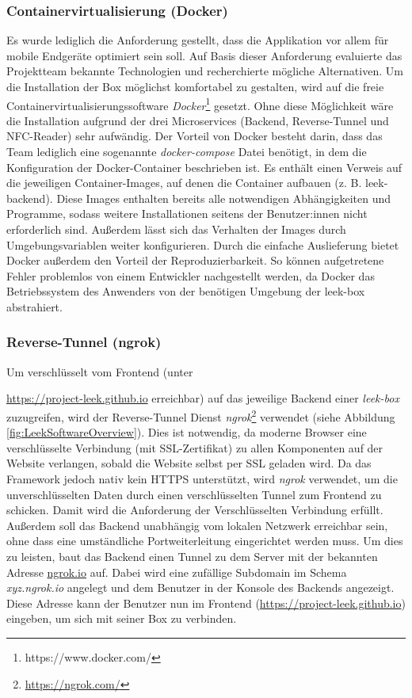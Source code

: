 \documentclass[10pt, a4paper]{article}
\begin{document}
\begin{onehalfspace}
  \subsubsection{Containervirtualisierung (Docker)}
  Es wurde lediglich die Anforderung gestellt, dass die Applikation vor allem für mobile Endgeräte optimiert sein soll.
  Auf Basis dieser Anforderung evaluierte das Projektteam bekannte Technologien und recherchierte mögliche Alternativen.
  Um die Installation der Box möglichst komfortabel zu gestalten, wird auf die freie Containervirtualisierungssoftware \textit{Docker}\footnote{https://www.docker.com/} gesetzt.
  Ohne diese Möglichkeit wäre die Installation aufgrund der drei Microservices (Backend, Reverse-Tunnel und NFC-Reader) sehr aufwändig.
  Der Vorteil von Docker besteht darin, dass das Team lediglich eine sogenannte \textit{docker-compose} Datei benötigt, in dem die Konfiguration der Docker-Container beschrieben ist.
  Es enthält einen Verweis auf die jeweiligen Container-Images, auf denen die Container aufbauen (z. B. leek-backend). Diese Images enthalten bereits alle notwendigen Abhängigkeiten und Programme,
  sodass weitere Installationen seitens der Benutzer:innen nicht erforderlich sind.
  Außerdem lässt sich das Verhalten der Images durch Umgebungsvariablen weiter konfigurieren. Durch die einfache Auslieferung bietet Docker außerdem den Vorteil der Reproduzierbarkeit.
  So können aufgetretene Fehler problemlos von einem Entwickler nachgestellt werden, da Docker das Betriebssystem des Anwenders von der benötigen Umgebung der leek-box abstrahiert.


  \subsubsection{Reverse-Tunnel (ngrok)}
  \label{kapitel:ngrok}
  Um verschlüsselt vom Frontend (unter \raggedright\url{https://project-leek.github.io} erreichbar) auf das jeweilige Backend einer \textit{leek-box} zuzugreifen, wird der Reverse-Tunnel Dienst \textit{ngrok}\footnote{\raggedright\url{https://ngrok.com/}} verwendet (siehe Abbildung \ref{fig:LeekSoftwareOverview}).
  Dies ist notwendig, da moderne Browser eine verschlüsselte Verbindung (mit SSL-Zertifikat) zu allen Komponenten auf der Website verlangen, sobald die Website selbst per SSL geladen wird.
  Da das Framework jedoch nativ kein HTTPS unterstützt, wird \textit{ngrok} verwendet, um die unverschlüsselten Daten durch einen verschlüsselten Tunnel zum Frontend zu schicken. Damit wird die Anforderung der Verschlüsselten Verbindung erfüllt.
  Außerdem soll das Backend unabhängig vom lokalen Netzwerk erreichbar sein, ohne dass eine umständliche Portweiterleitung eingerichtet werden muss. Um dies zu leisten, baut das Backend einen Tunnel zu dem Server mit der bekannten Adresse \url{ngrok.io} auf.
  Dabei wird eine zufällige Subdomain im Schema \textit{xyz.ngrok.io} angelegt und dem Benutzer in der Konsole des Backends angezeigt. Diese Adresse kann der Benutzer nun im Frontend (\url{https://project-leek.github.io}) eingeben, um sich mit seiner Box zu verbinden.


\end{onehalfspace}
\end{document}
